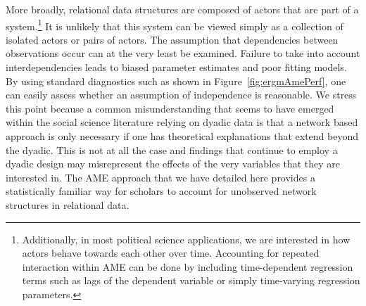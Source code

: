 \documentclass[12pt,pdflatex]{elsarticle}
\begin{document}
More broadly, relational data structures are composed of actors that are part of a system.\footnote{Additionally, in most political science applications, we are interested in how actors behave towards each other over time. Accounting for repeated interaction within AME can be done by including time-dependent regression terms such as lags of the dependent variable or simply time-varying regression parameters.} It is unlikely that this system can be viewed simply as a collection of isolated actors or pairs of actors. The assumption  that dependencies between observations occur can at the very least be examined. Failure to take into account interdependencies leads to biased parameter estimates and poor fitting models. By using standard diagnostics such as shown in Figure~\ref{fig:ergmAmePerf}, one can easily assess whether an assumption of independence is reasonable. We stress this point because a common misunderstanding that seems to have emerged within the social science literature relying on dyadic data is that a network based approach is only necessary if one has theoretical explanations that extend beyond the dyadic. This is not at all the case and findings that continue to employ a dyadic design may misrepresent the effects of the very variables that they are interested in. The AME approach that we have detailed here provides a statistically familiar way for scholars to account for unobserved network structures in relational data. 

\newpage

\clearpage

% 
\newpage
\end{document}
